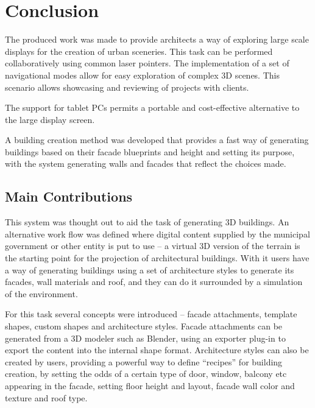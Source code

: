 \chapter{Conclusion}




The produced work was made to provide architects a way
of exploring large scale displays for the creation of urban sceneries.
This task can be performed collaboratively using common laser pointers.
The implementation of a set of navigational modes allow for easy
exploration of complex 3D scenes.
This scenario allows showcasing and reviewing of projects with clients.

The support for tablet PCs permits a portable and cost-effective alternative
to the large display screen.

A building creation method was developed that provides a fast way
of generating buildings based on their facade blueprints and height and
setting its purpose, with the system generating walls and facades that
reflect the choices made.



\section{Main Contributions}

This system was thought out to aid the task of generating 3D buildings.
An alternative work flow was defined where digital content supplied by
the municipal government or other entity is put to use -- a virtual 3D
version of the terrain is the starting point for the projection of
architectural buildings.
With it users have a way of generating buildings using a set of
architecture styles to generate its facades, wall materials and roof,
and they can do it surrounded by a simulation of the environment.

For this task several concepts were introduced -- facade attachments,
template shapes, custom shapes and architecture styles.
Facade attachments can be generated from a 3D modeler such as Blender,
using an exporter plug-in to export the content into the internal shape format.
Architecture styles can also be created by users, providing a 
powerful way to define ``recipes'' for building creation, by setting the
odds of a certain type of door, window, balcony etc appearing in the facade,
setting floor height and layout, facade wall color and texture and roof type.

